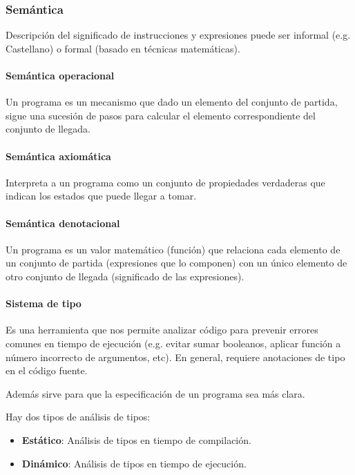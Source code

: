 \documentclass[10pt,a4paper]{article}
\begin{document}
\subsubsection{Semántica}

Descripción del significado de instrucciones y expresiones puede ser informal (e.g. Castellano) o formal (basado en técnicas matemáticas).

\paragraph{Semántica operacional} Un programa es un mecanismo que dado un elemento del conjunto de partida, sigue una sucesión de pasos para calcular el elemento correspondiente del conjunto de llegada.

\paragraph{Semántica axiomática} Interpreta a un programa como un conjunto de propiedades verdaderas que indican los estados que puede llegar a tomar.

\paragraph{Semántica denotacional} Un programa es un valor matemático (función) que relaciona cada elemento de un conjunto de partida (expresiones que lo componen) con un único elemento de otro conjunto de llegada (significado de las expresiones).

\paragraph{Sistema de tipo} Es una herramienta que nos permite analizar código para prevenir errores comunes en tiempo de ejecución (e.g. evitar sumar booleanos, aplicar función a número incorrecto de argumentos, etc). En general, requiere anotaciones de tipo en el código fuente. 

Además sirve para que la especificación de un programa sea más clara.

Hay dos tipos de análisis de tipos:
\begin{itemize}
	\item \textbf{Estático}: Análisis de tipos en tiempo de compilación.
	\item \textbf{Dinámico}: Análisis de tipos en tiempo de ejecución.
\end{itemize}
\end{document}
